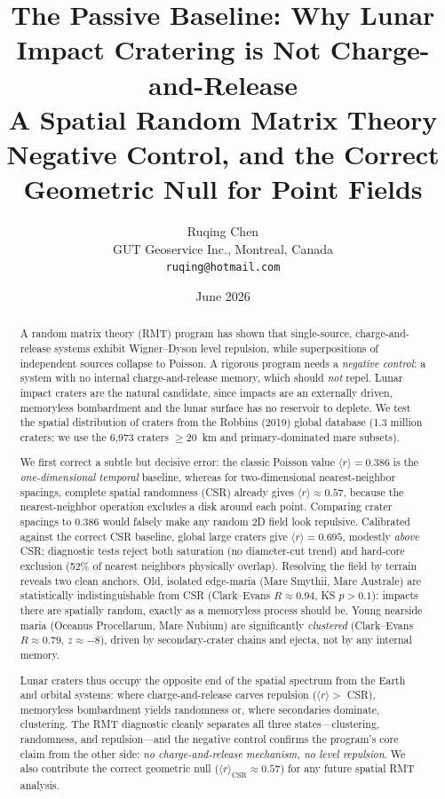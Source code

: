 \documentclass[12pt,a4paper]{article}
\title{\textbf{The Passive Baseline: Why Lunar Impact Cratering is Not Charge-and-Release}\\[0.4em]
\large A Spatial Random Matrix Theory Negative Control, and the Correct Geometric Null for Point Fields}
\author{Ruqing Chen\\ GUT Geoservice Inc., Montreal, Canada\\ \texttt{ruqing@hotmail.com}}
\date{June 2026}
\begin{document}
\maketitle

\begin{abstract}
\noindent A random matrix theory (RMT) program has shown that single-source, charge-and-release systems exhibit Wigner--Dyson level repulsion, while superpositions of independent sources collapse to Poisson. A rigorous program needs a \emph{negative control}: a system with no internal charge-and-release memory, which should \emph{not} repel. Lunar impact craters are the natural candidate, since impacts are an externally driven, memoryless bombardment and the lunar surface has no reservoir to deplete. We test the spatial distribution of craters from the Robbins (2019) global database (1.3 million craters; we use the 6{,}973 craters $\geq20$~km and primary-dominated mare subsets). 

We first correct a subtle but decisive error: the classic Poisson value $\langle r\rangle=0.386$ is the \emph{one-dimensional temporal} baseline, whereas for two-dimensional nearest-neighbor spacings, complete spatial randomness (CSR) already gives $\langle r\rangle\approx0.57$, because the nearest-neighbor operation excludes a disk around each point. Comparing crater spacings to $0.386$ would falsely make any random 2D field look repulsive. Calibrated against the correct CSR baseline, global large craters give $\langle r\rangle=0.695$, modestly \emph{above} CSR; diagnostic tests reject both saturation (no diameter-cut trend) and hard-core exclusion (52\% of nearest neighbors physically overlap). Resolving the field by terrain reveals two clean anchors. Old, isolated edge-maria (Mare Smythii, Mare Australe) are statistically indistinguishable from CSR (Clark--Evans $R\approx0.94$, KS $p>0.1$): impacts there are spatially random, exactly as a memoryless process should be. Young nearside maria (Oceanus Procellarum, Mare Nubium) are significantly \emph{clustered} (Clark--Evans $R\approx0.79$, $z\approx-8$), driven by secondary-crater chains and ejecta, not by any internal memory. 

Lunar craters thus occupy the opposite end of the spatial spectrum from the Earth and orbital systems: where charge-and-release carves repulsion ($\langle r\rangle>$ CSR), memoryless bombardment yields randomness or, where secondaries dominate, clustering. The RMT diagnostic cleanly separates all three states---clustering, randomness, and repulsion---and the negative control confirms the program's core claim from the other side: \emph{no charge-and-release mechanism, no level repulsion}. We also contribute the correct geometric null ($\langle r\rangle_{\mathrm{CSR}}\approx0.57$) for any future spatial RMT analysis.


\end{abstract}
\end{document}
